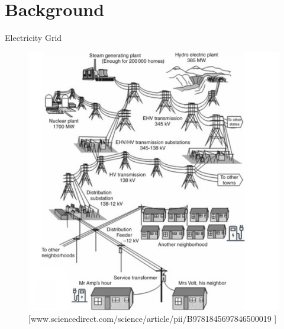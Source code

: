 \documentclass{beamer}
\begin{document}
\section{Background}
\begin{frame}{Electricity Grid}
\begin{figure}[!htbp]
\centering
\includegraphics[width=2.8 in , height=2.4 in]{Figures/EVchalendge1.png}
\caption{\tiny[www.sciencedirect.com/science/article/pii/B9781845697846500019 ]}
\end{figure}
\end{frame}


%

\end{document}
